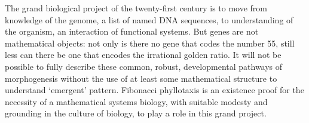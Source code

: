 The grand biological project of the twenty-first century is to move from knowledge of the genome, a list of named DNA sequences, to understanding of the organism, an interaction of functional systems.  But genes are not mathematical objects: not only is there no gene that codes the number 55, still less can there be one that encodes the irrational golden ratio.
It will not be possible to fully describe these common, robust, developmental pathways of morphogenesis without the use of at least some mathematical structure to  understand `emergent' pattern. %
Fibonacci phyllotaxis is an existence proof for the necessity of a mathematical systems biology, with suitable modesty and grounding in the culture of biology, to play a role in this grand project. 

